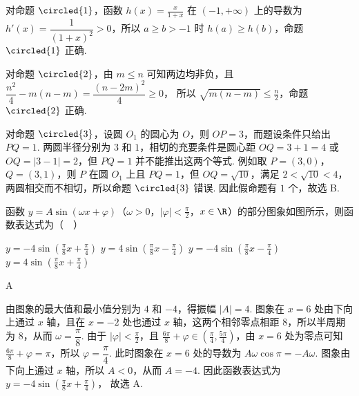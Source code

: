 \begin{solution}
对命题 \(\circled{1}\)，函数 \(h(x)=\frac{x}{1+x}\) 在 \((-1,+\infty)\) 上的导数为
\(h'(x)=\dfrac{1}{(1+x)^2}>0\)，所以 \(a\geqslant b>-1\) 时 \(h(a)\geqslant h(b)\)，命题 \(\circled{1}\) 正确.

对命题 \(\circled{2}\)，由 \(m\leqslant n\) 可知两边均非负，且
\(\dfrac{n^2}{4}-m(n-m)=\dfrac{(n-2m)^2}{4}\geqslant0\)，
所以 \(\sqrt{m(n-m)}\leqslant\frac{n}{2}\)，命题 \(\circled{2}\) 正确.

对命题 \(\circled{3}\)，设圆 \(O_1\) 的圆心为 \(O\)，则 \(OP=3\)，而题设条件只给出 \(PQ=1\). 两圆半径分别为 \(3\) 和 \(1\)，相切的充要条件是圆心距 \(OQ=3+1=4\) 或 \(OQ=\left|3-1\right|=2\)，但 \(PQ=1\) 并不能推出这两个等式. 例如取 \(P=(3,0)\)，\(Q=(3,1)\)，则 \(P\) 在圆 \(O_1\) 上且 \(PQ=1\)，但 \(OQ=\sqrt{10}\)，满足 \(2<\sqrt{10}<4\)，两圆相交而不相切，所以命题 \(\circled{3}\) 错误. 因此假命题有 \(1\) 个，故选 B.
\end{solution}

\begin{problem}
函数 \( y = A \sin (\omega x + \varphi) \)（\(\omega > 0\)，\(|\varphi| < \frac{\pi}{2}\)，\(x \in \R\)）的部分图象如图所示，则函数表达式为（\(\quad\)）


\choices
    {\(y = -4\sin \left(\frac{\pi}{8} x + \frac{\pi}{4}\right)\)}
    {\(y = 4\sin \left(\frac{\pi}{8} x - \frac{\pi}{4}\right)\)}
    {\(y = -4\sin \left(\frac{\pi}{8} x - \frac{\pi}{4}\right)\)}
    {\(y = 4\sin \left(\frac{\pi}{8} x + \frac{\pi}{4}\right)\)}
\end{problem}

\begin{answer}
A
\end{answer}

\begin{solution}
由图象的最大值和最小值分别为 \(4\) 和 \(-4\)，得振幅 \(|A|=4\). 图象在 \(x=6\) 处由下向上通过 \(x\) 轴，且在 \(x=-2\) 处也通过 \(x\) 轴，这两个相邻零点相距 \(8\)，所以半周期为 \(8\)，从而
\(\omega=\dfrac{\pi}{8}\).
由于 \(|\varphi|<\frac{\pi}{2}\)，且 \(\frac{6\pi}{8}+\varphi\in\left(\frac{\pi}{4},\frac{5\pi}{4}\right)\)，由 \(x=6\) 处为零点可知
\(\frac{6\pi}{8}+\varphi=\pi\)，所以 \(\varphi=\dfrac{\pi}{4}\).
此时图象在 \(x=6\) 处的导数为 \(A\omega\cos\pi=-A\omega\). 图象由下向上通过 \(x\) 轴，所以 \(A<0\)，从而 \(A=-4\).
因此函数表达式为
\(y=-4\sin\left(\frac{\pi}{8}x+\frac{\pi}{4}\right)\)，
故选 A.
\end{solution}

